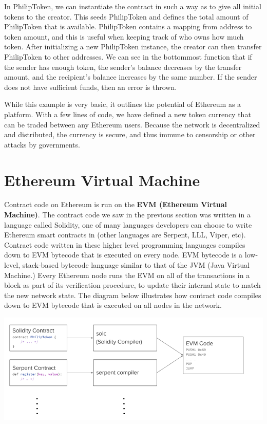 \documentclass[full.tex]{subfiles}
\begin{document}
    In PhilipToken, we can instantiate the contract in such a way as to give all initial tokens to the creator. This seeds PhilipToken and defines the total amount of PhilipToken that is available. PhilipToken contains a mapping from address to token amount, and this is useful when keeping track of who owns how much token. After initializing a new PhilipToken instance, the creator can then transfer PhilipToken to other addresses. We can see in the bottommost function that if the sender has enough token, the sender's balance decreases by the transfer amount, and the recipient's balance increases by the same number. If the sender does not have sufficient funds, then an error is thrown.
    
    While this example is very basic, it outlines the potential of Ethereum as a platform. With a few lines of code, we have defined a new token currency that can be traded between any Ethereum users. Because the network is decentralized and distributed, the currency is secure, and thus immune to censorship or other attacks by governments.
    
    \section*{Ethereum Virtual Machine}
    
    Contract code on Ethereum is run on the \textbf{EVM (Ethereum Virtual Machine)}. The contract code we saw in the previous section was written in a language called Solidity, one of many languages developers can choose to write Ethereum smart contracts in (other languages are Serpent, LLL, Viper, etc). Contract code written in these higher level programming languages compiles down to EVM bytecode that is executed on every node. EVM bytecode is a low-level, stack-based bytecode language similar to that of the JVM (Java Virtual Machine.) Every Ethereum node runs the EVM on all of the transactions in a block as part of its verification procedure, to update their internal state to match the new network state. The diagram below illustrates how contract code compiles down to EVM bytecode that is executed on all nodes in the network.
    
    \begin{center}
        \includegraphics[scale=0.5]{evm_pipeline}
    \end{center}
    
\end{document}
